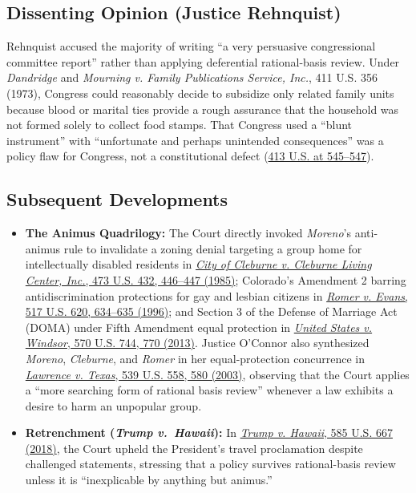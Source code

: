 \documentclass[12pt]{article}
\begin{document}
\subsection{Dissenting Opinion (Justice Rehnquist)}

Rehnquist accused the majority of writing ``a very persuasive congressional committee report'' rather than applying deferential rational-basis review. Under \textit{Dandridge} and \textit{Mourning v. Family Publications Service, Inc.}, 411 U.S. 356 (1973), Congress could reasonably decide to subsidize only related family units because blood or marital ties provide a rough assurance that the household was not formed solely to collect food stamps. That Congress used a ``blunt instrument'' with ``unfortunate and perhaps unintended consequences'' was a policy flaw for Congress, not a constitutional defect (\href{https://supreme.justia.com/cases/federal/us/413/528/}{413 U.S. at 545--547}).

\subsection{Subsequent Developments}

\begin{itemize}

\item \textbf{The Animus Quadrilogy:} The Court directly invoked \textit{Moreno}'s anti-animus rule to invalidate a zoning denial targeting a group home for intellectually disabled residents in \href{https://supreme.justia.com/cases/federal/us/473/432/}{\textit{City of Cleburne v. Cleburne Living Center, Inc.}, 473 U.S. 432, 446--447 (1985)}; Colorado's Amendment 2 barring antidiscrimination protections for gay and lesbian citizens in \href{https://supreme.justia.com/cases/federal/us/517/620/}{\textit{Romer v. Evans}, 517 U.S. 620, 634--635 (1996)}; and Section 3 of the Defense of Marriage Act (DOMA) under Fifth Amendment equal protection in \href{https://supreme.justia.com/cases/federal/us/570/744/}{\textit{United States v. Windsor}, 570 U.S. 744, 770 (2013)}. Justice O'Connor also synthesized \textit{Moreno}, \textit{Cleburne}, and \textit{Romer} in her equal-protection concurrence in \href{https://supreme.justia.com/cases/federal/us/539/558/}{\textit{Lawrence v. Texas}, 539 U.S. 558, 580 (2003)}, observing that the Court applies a ``more searching form of rational basis review'' whenever a law exhibits a desire to harm an unpopular group.

\item \textbf{Retrenchment (\textit{Trump v.\ Hawaii}):} In \href{https://supreme.justia.com/cases/federal/us/585/17-965/}{\textit{Trump v. Hawaii}, 585 U.S. 667 (2018)}, the Court upheld the President's travel proclamation despite challenged statements, stressing that a policy survives rational-basis review unless it is ``inexplicable by anything but animus.''

\end{itemize}
\end{document}

